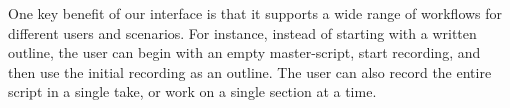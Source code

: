 

One key benefit of our interface is that it supports a wide range of workflows for different users and scenarios. For instance, instead of starting with a written outline, the user can begin with an empty master-script, start recording, and then use  the initial recording as an outline. The user can also record the entire script in a single take, or work on a single section at a time. 
